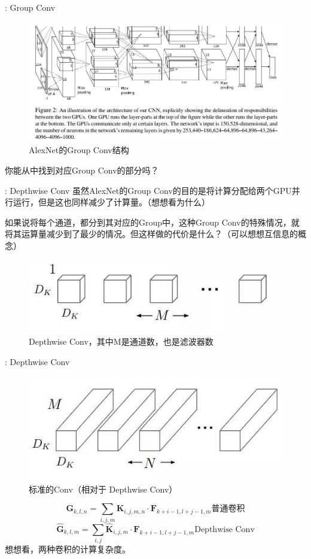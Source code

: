 \begin{frame}{\titleprefix: Group Conv}
	\begin{figure}
		\centering
		\includegraphics[width=0.9\linewidth]{Images/groupconv_1}
		\caption{AlexNet的Group Conv结构}
		\label{fig:groupconv1}
	\end{figure}
你能从中找到对应Group Conv的部分吗？
\end{frame}

\begin{frame}{\titleprefix: Depthwise Conv}
	虽然AlexNet的Group Conv的目的是将计算分配给两个GPU并行运行，但是这也同样减少了计算量。（想想看为什么）
	
	如果说将每个通道，都分到其对应的Group中，这种Group Conv的特殊情况，就将其运算量减少到了最少的情况。但这样做的代价是什么？（可以想想\alert{互信息}的概念）
\begin{figure}
	\centering
	\includegraphics[width=0.7\linewidth]{Images/depthwise_1}
	\caption{Depthwise Conv，其中M是通道数，也是滤波器数}
	\label{fig:depthwise1}
\end{figure}

\end{frame}

\begin{frame}{\titleprefix: Depthwise Conv}
	\begin{figure}
		\centering
		\includegraphics[width=0.5\linewidth]{Images/depthwise_2}
		\caption{标准的Conv（相对于 Depthwise Conv）}
		\label{fig:depthwise2}
	\end{figure}
	\[
\mathbf{G}_{k, l, n}=\sum_{i, j, m} \mathbf{K}_{i, j, m, n} \cdot \mathbf{F}_{k+i-1, l+j-1, m}
\text{普通卷积}
\]	
\[
\hat{\mathbf{G}}_{k, l, m}=\sum_{i, j} \hat{\mathbf{K}}_{i, j, m} \cdot \mathbf{F}_{k+i-1, l+j-1, m}
\text{Depthwise Conv}
\]
想想看，两种卷积的计算复杂度。
\end{frame}

